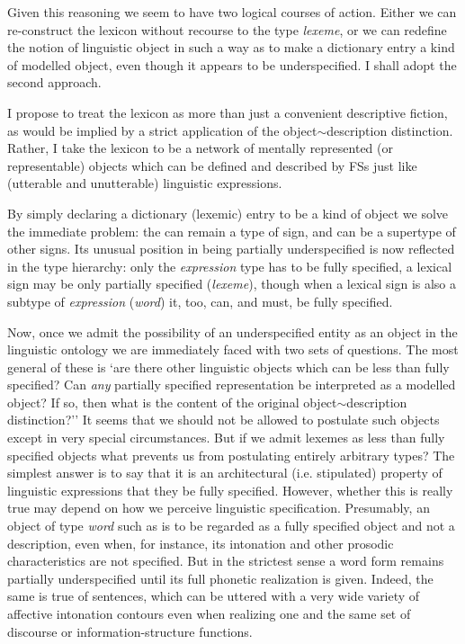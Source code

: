\documentclass[output=paper]{langsci/langscibook}
\begin{document}
Given this reasoning we seem to have two logical courses of action. Either we can re-construct the  lexicon without recourse to the type \textit{lexeme}, or we can redefine the notion of linguistic object in such a way as to make a dictionary entry a kind of modelled object, even though it appears to be underspecified. I shall adopt the second approach.

I propose to treat the lexicon as more than just a convenient descriptive fiction, as would be implied by  a strict application of the object$\sim$description distinction. Rather, I take the lexicon to be a network of mentally represented (or representable) objects which can be defined and described by FSs just like (utterable and unutterable) linguistic expressions.

By simply declaring a dictionary (lexemic) entry to be a kind of object we solve the immediate problem: the  can remain a type of sign, and can be a supertype of other signs. Its unusual position in being partially underspecified is now reflected in the type hierarchy: only the \textit{expression} type has to be fully specified, a lexical sign may be only partially specified (\textit{lexeme}), though when a lexical sign is also a subtype of \textit{expression} (\textit{word}) it, too, can, and must, be fully specified.

Now, once we admit the possibility of an underspecified entity as an object in the linguistic ontology we are immediately faced with two sets of questions. The most general of these is `are there other linguistic objects which can be less than fully specified? Can \emph{any} partially specified representation be interpreted as a modelled object? If so, then what is the content of the original object$\sim$description distinction?'' %
It seems that we should not be allowed to postulate such objects except in very special circumstances. But if we admit lexemes as less than fully specified objects  what prevents us from postulating entirely arbitrary types? The simplest answer is to say that it is an architectural (i.e. stipulated) property of linguistic
expressions that they be fully specified. However, whether this is really true may depend on how we perceive linguistic specification. Presumably, an object of type \textit{word} such as  is to be regarded as a fully specified object and not a description, even when, for instance, its intonation and other prosodic characteristics are not specified. But in the strictest sense a word form remains partially underspecified until its full phonetic realization is given. Indeed, the same is true of sentences, which can be uttered with a very wide variety of affective intonation contours even when realizing one and the same set of discourse or information-structure functions.
\end{document}
